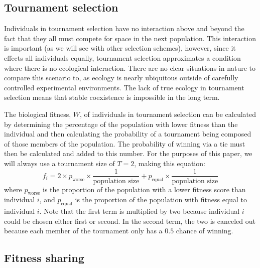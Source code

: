 \subsection{Tournament selection}
Individuals in tournament selection have no interaction above and beyond the fact that they all must compete for space in the next population. This interaction is important (as we will see with other selection schemes), however, since it effects all individuals equally, tournament selection approximates a condition where there is no ecological interaction. There are no clear situations in nature to compare this scenario to, as ecology is nearly ubiquitous outside of carefully controlled experimental environments. The lack of true ecology in tournament selection means that stable coexistence is impossible in the long term. 

The biological fitness, $W$, of individuals in tournament selection can be calculated by determining the percentage of the population with lower fitness than the individual and then calculating the probability of a tournament being composed of those members of the population. The probability of winning via a tie must then be calculated and added to this number. For the purposes of this paper, we will always use a tournament size of $T=2$, making this equation:
\begin{equation}
f_{i} = 2\times p_{\text{worse}} \times \frac{1}{\text{population size}} + p_{\text{equal}} \times \frac{1}{\text{population size}}
\label{tournament_equation}
\end{equation}
where $p_{\text{worse}}$ is the proportion of the population with a lower fitness score than individual $i$, and $p_{\text{equal}}$ is the proportion of the population with fitness equal to individual $i$. Note that the first term is multiplied by two because individual $i$ could be chosen either first or second. In the second term, the two is canceled out because each member of the tournament only has a $0.5$ chance of winning.

\subsection{Fitness sharing}

